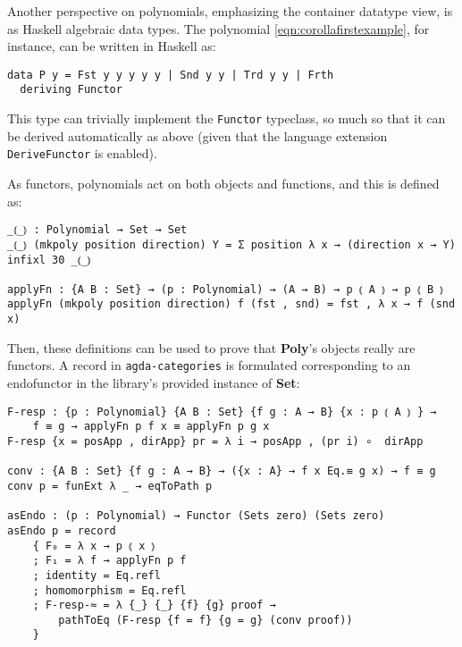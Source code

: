 Another perspective on polynomials, emphasizing the container datatype view, is as Haskell algebraic data types.
The polynomial \ref{eqn:corollafirstexample}, for instance, can be written in Haskell as:
\begin{verbatim}
data P y = Fst y y y y y | Snd y y | Trd y y | Frth
  deriving Functor
\end{verbatim}
This type can trivially implement the \texttt{Functor} typeclass, so much so that it can be derived automatically as above (given that the language extension \texttt{DeriveFunctor} is enabled).


As functors, polynomials act on both objects and functions, and this is defined as:
\begin{verbatim}
_⦅_⦆ : Polynomial → Set → Set
_⦅_⦆ (mkpoly position direction) Y = Σ position λ x → (direction x → Y)
infixl 30 _⦅_⦆

applyFn : {A B : Set} → (p : Polynomial) → (A → B) → p ⦅ A ⦆ → p ⦅ B ⦆
applyFn (mkpoly position direction) f (fst , snd) = fst , λ x → f (snd x)
\end{verbatim}

Then, these definitions can be used to prove that \textbf{Poly}'s objects really are functors. 
A record in \texttt{agda-categories} is formulated corresponding to an endofunctor in the library's provided instance of \textbf{Set}:

\begin{verbatim}
F-resp : {p : Polynomial} {A B : Set} {f g : A → B} {x : p ⦅ A ⦆ } → 
    f ≡ g → applyFn p f x ≡ applyFn p g x
F-resp {x = posApp , dirApp} pr = λ i → posApp , (pr i) ∘  dirApp

conv : {A B : Set} {f g : A → B} → ({x : A} → f x Eq.≡ g x) → f ≡ g
conv p = funExt λ _ → eqToPath p

asEndo : (p : Polynomial) → Functor (Sets zero) (Sets zero)
asEndo p = record
    { F₀ = λ x → p ⦅ x ⦆
    ; F₁ = λ f → applyFn p f
    ; identity = Eq.refl
    ; homomorphism = Eq.refl
    ; F-resp-≈ = λ {_} {_} {f} {g} proof → 
        pathToEq (F-resp {f = f} {g = g} (conv proof))
    }
\end{verbatim}


